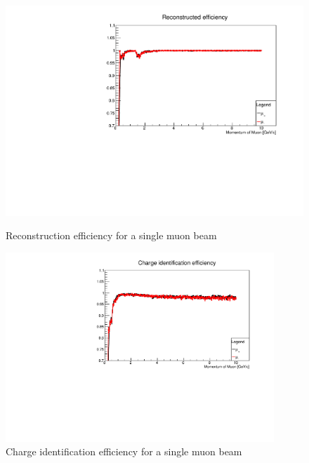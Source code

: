 \begin{figure}[h!]
	\begin{minipage}{0.49\linewidth}
		\centerline{\includegraphics[width=0.9\linewidth]{figures/FullFitted.pdf}}
			\caption[]{Reconstruction efficiency for a single muon beam}
		\label{fig:fullcharge}
	\end{minipage}
	\hfill
	\begin{minipage}{0.49\linewidth}
		\centerline{\includegraphics[width=0.9\textwidth]{figures/FullChargeID.pdf}}
		\caption[]{Charge identification efficiency for a single muon beam}
		\label{fig:fullrec}
	\end{minipage}
\end{figure}


